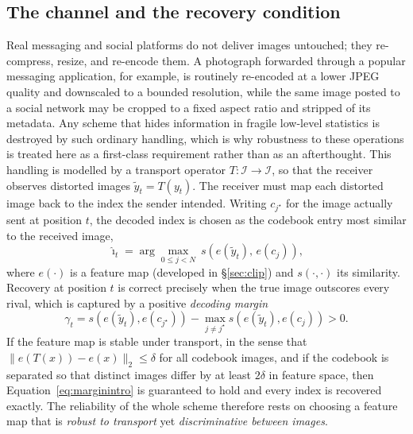 \documentclass[11pt]{article}
\theoremstyle{definition}
\newcommand{\Eqn}[1]{Equation~\eqref{#1}}
\begin{document}
\subsection{The channel and the recovery condition}\label{sec:channel}
Real messaging and social platforms do not deliver images untouched; they
re-compress, resize, and re-encode them. A photograph forwarded through a popular
messaging application, for example, is routinely re-encoded at a lower JPEG quality
and downscaled to a bounded resolution, while the same image posted to a social
network may be cropped to a fixed aspect ratio and stripped of its metadata. Any
scheme that hides information in fragile low-level statistics is destroyed by such
ordinary handling, which is why robustness to these operations is treated here as a
first-class requirement rather than as an afterthought. This handling is modelled by
a transport operator
$T:\mathcal{I}\to\mathcal{I}$, so that the receiver observes distorted images
$\tilde y_t = T(y_t)$. The receiver must map each distorted image back to the
index the sender intended. Writing $c_{j^\star}$ for the image actually sent at
position $t$, the decoded index is chosen as the codebook entry most similar to
the received image,
\begin{equation}
  \hat\imath_t = \arg\max_{0\le j<N}\ s\!\left(e(\tilde y_t),\,e(c_j)\right),
  \label{eq:nnintro}
\end{equation}
where $e(\cdot)$ is a feature map (developed in \S\ref{sec:clip}) and $s(\cdot,\cdot)$
its similarity. Recovery at position $t$ is correct precisely when the true image
outscores every rival, which is captured by a positive \emph{decoding margin}
\begin{equation}
  \gamma_t = s\!\left(e(\tilde y_t),e(c_{j^\star})\right)
           - \max_{j\neq j^\star} s\!\left(e(\tilde y_t),e(c_j)\right) > 0 .
  \label{eq:marginintro}
\end{equation}
If the feature map is stable under transport, in the sense that
$\lVert e(T(x))-e(x)\rVert_2\le\delta$ for all codebook images, and if the codebook
is separated so that distinct images differ by at least $2\delta$ in feature space,
then \Eqn{eq:marginintro} is guaranteed to hold and every index is recovered
exactly. The reliability of the whole scheme therefore rests on choosing a feature
map that is \emph{robust to transport} yet \emph{discriminative between images}.
\end{document}
